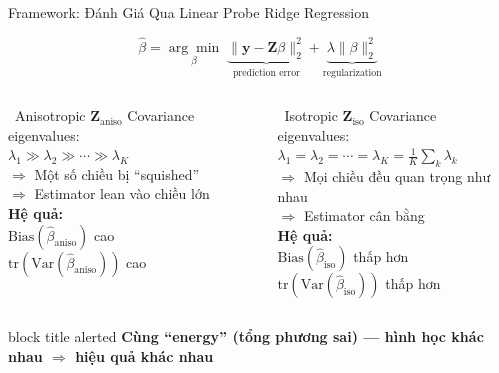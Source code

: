 \documentclass[aspectratio=169,11pt]{beamer}
\newcommand{\cmark}{\ding{51}}
\newcommand{\xmark}{\ding{55}}
\newcommand{\takeaway}[1]{%
  \vfill
  \begin{beamercolorbox}[sep=4pt,center,rounded=true]{block title alerted}
    \small\bfseries #1
  \end{beamercolorbox}%
}
\begin{document}
\begin{frame}{Framework: Đánh Giá Qua Linear Probe Ridge Regression}
\begin{center}
  \large
  \[
  \hat{\beta}
  = \underset{\beta}{\arg\min}\;
    \underbrace{\|\mathbf{y} - \mathbf{Z}\beta\|_2^2}_{\text{prediction error}}
  + \underbrace{\lambda\|\beta\|_2^2}_{\text{regularization}}
  \]
\end{center}
\vspace{0.1cm}
\begin{columns}[t]
  \begin{alertblock}{\textcolor{bad}{\xmark}\ Anisotropic $\mathbf{Z}_{\text{aniso}}$}
    \footnotesize
    Covariance eigenvalues:\\
    $\lambda_1 \gg \lambda_2 \gg \cdots \gg \lambda_K$\\[4pt]
    \textcolor{bad}{$\Rightarrow$ Một số chiều bị ``squished''}\\
    \textcolor{bad}{$\Rightarrow$ Estimator lean vào chiều lớn}\\[4pt]
    \textbf{Hệ quả:}\\
    $\text{Bias}(\hat\beta_{\text{aniso}})$ cao\\
    $\text{tr}(\text{Var}(\hat\beta_{\text{aniso}}))$ cao
  \end{alertblock}
  \begin{exampleblock}{\textcolor{good}{\cmark}\ Isotropic $\mathbf{Z}_{\text{iso}}$}
    \footnotesize
    Covariance eigenvalues:\\
    $\lambda_1 = \lambda_2 = \cdots = \lambda_K = \tfrac{1}{K}\sum_k\lambda_k$\\[4pt]
    \textcolor{good}{$\Rightarrow$ Mọi chiều đều quan trọng như nhau}\\
    \textcolor{good}{$\Rightarrow$ Estimator cân bằng}\\[4pt]
    \textbf{Hệ quả:}\\
    $\text{Bias}(\hat\beta_{\text{iso}})$ thấp hơn\\
    $\text{tr}(\text{Var}(\hat\beta_{\text{iso}}))$ thấp hơn
  \end{exampleblock}
\end{columns}
\takeaway{Cùng ``energy'' (tổng phương sai) — hình học khác nhau $\Rightarrow$ hiệu quả khác nhau}
\end{frame}
\end{document}
